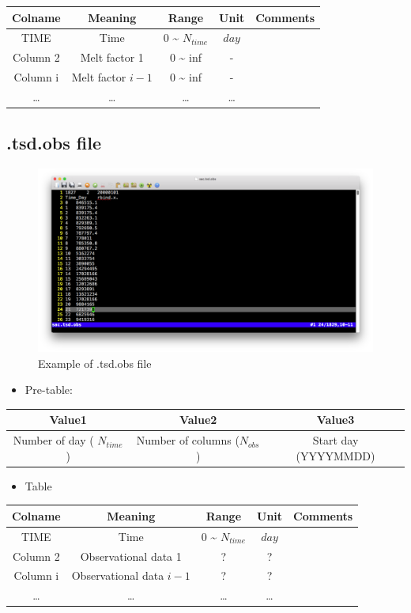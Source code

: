 \documentclass[]{scrbook}
\providecommand{\tightlist}{%
  \setlength{\itemsep}{0pt}\setlength{\parskip}{0pt}}
\begin{document}
\begin{longtable}[]{@{}ccccc@{}}
\toprule
Colname & Meaning & Range & Unit & Comments\tabularnewline
\midrule
\endhead
TIME & Time & 0 \textasciitilde{} \(N_{time}\) & \(day\)
&\tabularnewline
Column 2 & Melt factor 1 & 0 \textasciitilde{} inf & - &\tabularnewline
Column i & Melt factor \(i-1\) & 0 \textasciitilde{} inf & -
&\tabularnewline
\ldots{} & \ldots{} & \ldots{} & \ldots{} &\tabularnewline
\bottomrule
\end{longtable}

\subsection{.tsd.obs file}\label{tsd.obs-file}

\begin{figure}
\centering
\includegraphics{Fig/IO/tsd.obs.png}
\caption{Example of .tsd.obs file}
\end{figure}

\begin{itemize}
\tightlist
\item
  Pre-table:
\end{itemize}

\begin{longtable}[]{@{}ccc@{}}
\toprule
Value1 & Value2 & Value3\tabularnewline
\midrule
\endhead
Number of day ( \(N_{time}\)) & Number of columns (\(N_{obs}\)) & Start
day (YYYYMMDD)\tabularnewline
\bottomrule
\end{longtable}

\begin{itemize}
\tightlist
\item
  Table
\end{itemize}

\begin{longtable}[]{@{}ccccc@{}}
\toprule
Colname & Meaning & Range & Unit & Comments\tabularnewline
\midrule
\endhead
TIME & Time & 0 \textasciitilde{} \(N_{time}\) & \(day\)
&\tabularnewline
Column 2 & Observational data 1 & ? & ? &\tabularnewline
Column i & Observational data \(i-1\) & ? & ? &\tabularnewline
\ldots{} & \ldots{} & \ldots{} & \ldots{} &\tabularnewline
\bottomrule
\end{longtable}
\end{document}
